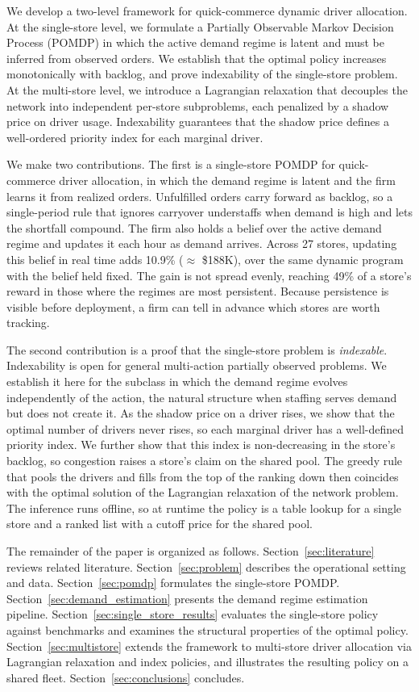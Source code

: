 \documentclass[preprint,11pt,authoryear]{elsarticle}
\theoremstyle{remark}
\begin{document}
We develop a two-level framework for quick-commerce dynamic driver allocation. At the single-store level, we formulate a Partially Observable Markov Decision Process (POMDP) in which the active demand regime is latent and must be inferred from observed orders. We establish that the optimal policy increases monotonically with backlog, and prove indexability of the single-store problem. At the multi-store level, we introduce a Lagrangian relaxation that decouples the network into independent per-store subproblems, each penalized by a shadow price on driver usage. Indexability guarantees that the shadow price defines a well-ordered priority index for each marginal driver.

We make two contributions. The first is a single-store POMDP for quick-commerce driver allocation, in which the demand regime is latent and the firm learns it from realized orders. Unfulfilled orders carry forward as backlog, so a single-period rule that ignores carryover understaffs when demand is high and lets the shortfall compound. The firm also holds a belief over the active demand regime and updates it each hour as demand arrives. Across 27 stores, updating this belief in real time adds 10.9\% ($\approx$ \$188K), over the same dynamic program with the belief held fixed. The gain is not spread evenly, reaching 49\% of a store's reward in those where the regimes are most persistent. Because persistence is visible before deployment, a firm can tell in advance which stores are worth tracking. 

The second contribution is a proof that the single-store problem is \emph{indexable}. Indexability is open for general multi-action partially observed problems. We establish it here for the subclass in which the demand regime evolves independently of the action, the natural structure when staffing serves demand but does not create it. As the shadow price on a driver rises, we show that the optimal number of drivers never rises, so each marginal driver has a well-defined priority index. We further show that this index is non-decreasing in the store’s backlog, so congestion raises a store’s claim on the shared pool. The greedy rule that pools the drivers and fills from the top of the ranking down then coincides with the optimal solution of the Lagrangian relaxation of the network problem. The inference runs offline, so at runtime the policy is a table lookup for a single store and a ranked list with a cutoff price for the shared pool.

The remainder of the paper is organized as follows. Section~\ref{sec:literature} reviews related literature. Section~\ref{sec:problem} describes the operational setting and data. Section~\ref{sec:pomdp} formulates the single-store POMDP.  Section~\ref{sec:demand_estimation} presents the demand regime estimation pipeline. Section~\ref{sec:single_store_results} evaluates the single-store policy against benchmarks and examines the structural properties of the optimal policy. Section~\ref{sec:multistore} extends the framework to multi-store driver allocation via Lagrangian relaxation and index policies, and illustrates the resulting policy on a shared fleet. Section~\ref{sec:conclusions} concludes.
\end{document}

